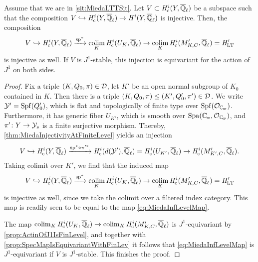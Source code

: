 \documentclass[../main.tex]{subfiles}
\begin{document}
\begin{thm}\label{thm:MiedaAppliedToLTT}
  Assume that we are in \cref{sit:MiedaLTTSit}.
  Let $V \subset \mathit H_{\mathrm{c}}^i(Y, {\overline {\mathbb{Q}}_\ell})$ be a subspace such that the composition 
  $V \hookrightarrow \mathit H_{\mathrm{c}}^i(Y, {\overline {\mathbb{Q}}_\ell}) \to \mathit H^i(Y, {\overline {\mathbb{Q}}_\ell})$ is injective. Then, the composition
  \begin{equation}\label{eq:MiedaInfLevelMap}
  V \hookrightarrow \mathit H_{\mathrm{c}}^i(Y, {\overline {\mathbb{Q}}_\ell}) \xrightarrow{\mathrm{sp}^*} \operatorname*{colim}_K \mathit H_{\mathrm{c}}^{i}(U_K, {\overline {\mathbb{Q}}_\ell})
  \to \operatorname*{colim}_K \mathit H_{\mathrm{c}}^i(M'_{K,C}, {\overline {\mathbb{Q}}_\ell}) = \mathit H_{\mathrm{LT}}'
  \end{equation}
  is injective as well. If $V$ is $J^1$-stable, this injection is equivariant 
  for the action of $J^1$ on both sides.
\begin{proof}
  Fix a triple $(K, Q_0, \pi) \in \mathcal{D}$, let $K'$ be an open normal subgroup 
  of $K_0$ contained in $K$. Then there is a triple 
  $(K, Q_0, \pi) \leq (K', Q_0', \pi') \in \mathcal{D}$. We write $\mathcal{Y}' = \operatorname{Spf}(Q_0')$,
  which is flat and topologically of finite type over $\spf(\cO_\Cp)$. 
  Furthermore, it has generic fiber $U_{K'}$, which is smooth over 
  $\spa(\Cp, \cO_\Cp)$, and $\pi'\colon Y \to \mathcal{Y}_s$ is a finite surjective
  morphism.
  Thereby, \cref{thm:MiedaInjectivityAtFiniteLevel} yields an injection
  \begin{equation*}
    V \hookrightarrow \mathit H_{\mathrm{c}}^i(Y, {\overline {\mathbb{Q}}_\ell}) \xrightarrow{\mathrm{sp}^* \circ \pi'^*} 
    \mathit H_{\mathrm{c}}^i(d(\mathcal{Y}'), {\overline {\mathbb{Q}}_\ell}) = \mathit H_{\mathrm{c}}^i(U_{K'}, {\overline {\mathbb{Q}}_\ell}) \to \mathit H_{\mathrm{c}}^i(M'_{K', C}, {\overline {\mathbb{Q}}_\ell}).
  \end{equation*}
  Taking colimit over $K'$, we find that the induced map 
  \begin{equation*}
    V \hookrightarrow \mathit H_{\mathrm{c}}^i(Y, {\overline {\mathbb{Q}}_\ell}) \xrightarrow{\mathrm{sp}^*} \operatorname*{colim}_K \mathit H_{\mathrm{c}}^{i}(U_K, {\overline {\mathbb{Q}}_\ell})
    \to \operatorname*{colim}_K \mathit H_{\mathrm{c}}^i(M'_{K,C}, {\overline {\mathbb{Q}}_\ell}) = \mathit H_{\mathrm{LT}}'
  \end{equation*}
  is injective as well, since we take the colimit over a filtered index
  category. This map is readily seen to be equal to the map
  \eqref{eq:MiedaInfLevelMap}.

  The map $\operatorname*{colim}_K \mathit H_{\mathrm{c}}^{i}(U_K, {\overline {\mathbb{Q}}_\ell}) \to \operatorname*{colim}_K \mathit H_{\mathrm{c}}^i(M'_{K,C}, {\overline {\mathbb{Q}}_\ell})$
  is $J^1$-equivariant by \cref{prop:ActinOfJ1IsFinLevel}, and together with 
  \cref{prop:SpecMapIsEquivariantWithFinLev} it follows that
  \eqref{eq:MiedaInfLevelMap} is $J^1$-equivariant if $V$ is $J^1$-stable. This
  finishes the proof.
\end{proof}
\end{thm}


\end{document}
